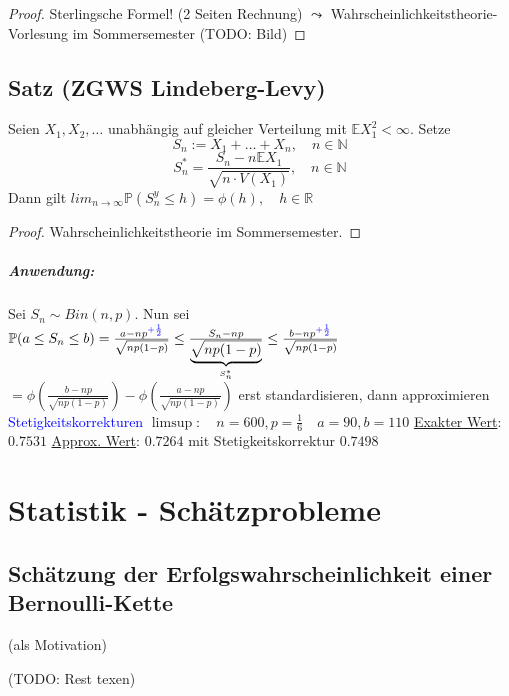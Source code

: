 \documentclass[a4paper,11pt,notitlepage]{report}
\newcommand{\R}{{\ensuremath{\mathbb{R}}}}
\newcommand{\N}{{\ensuremath{\mathbb{N}}}}
\newcommand{\Prim}{{\ensuremath{\mathbb{P}}}}
\newcommand{\E}{{\ensuremath{\mathbb{E}}}}
\begin{document}
\begin{proof}
	Sterlingsche Formel! (2 Seiten Rechnung) $\leadsto$ Wahrscheinlichkeitstheorie-Vorlesung im Sommersemester
	\newline
	(TODO: Bild)
\end{proof}

\section{Satz (ZGWS Lindeberg-Levy)}
Seien $X_1, X_2, \ldots$ unabhängig auf gleicher Verteilung mit $\E X_1^2 < \infty$.
Setze $$S_n := X_1 + \ldots + X_n, \quad n \in \N$$
$$S_n^* = \frac{S_n - n \E X_1}{\sqrt{n \cdot V(X_1)}}, \quad n \in \N$$
Dann gilt $lim_{n \rightarrow \infty}{\Prim(S_n^y \leq h)} = \phi(h), \quad h \in \R$

\begin{proof}
	Wahrscheinlichkeitstheorie im Sommersemester.
\end{proof}

\paragraph{Anwendung:}
Sei $S_n \sim Bin(n,p)$. \newline
Nun sei $\Prim(a \leq S_n \leq b) = \frac{a - np^{ \textcolor{blue}{+ \frac{1}{2}}}}{\sqrt{n p (1-p)}} \leq \frac{S_n - np}{\underbrace{\sqrt{n p (1-p)}}_{S_n^*}} \leq \frac{b - np ^{\textcolor{blue}{+\frac{1}{2}}}}{\sqrt{n p (1-p)}} $
$= \phi\left(\frac{b-np}{\sqrt{n p (1-p)}}\right) - \phi\left(\frac{a-np}{\sqrt{n p (1-p)}}\right)$
\newline
erst standardisieren, dann approximieren
\newline
\textcolor{blue}{Stetigkeitskorrekturen}
\newline
$\limsup \colon \quad n = 600, p = \frac{1}{6} \quad a = 90, b = 110$
\newline
\underline{Exakter Wert}: $0.7531$
\newline
\underline{Approx. Wert}: $0.7264$ mit Stetigkeitskorrektur $0.7498$

\chapter{Statistik - Schätzprobleme}

\section{Schätzung der Erfolgswahrscheinlichkeit einer Bernoulli-Kette} (als Motivation)

(TODO: Rest texen)
\end{document}
